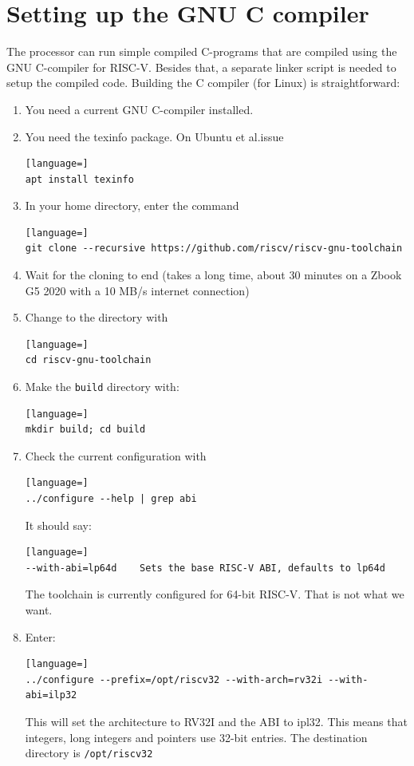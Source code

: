 \documentclass[12pt]{article}
\begin{document}
\section{Setting up the GNU C compiler}
The processor can run simple compiled C-programs that are compiled using the GNU C-compiler for RISC-V. Besides that, a separate linker script is needed to setup the compiled code. Building the C compiler (for Linux) is straightforward:

\begin{enumerate}
\item You need a current GNU C-compiler installed.
\item You need the texinfo package. On Ubuntu et al.\@ issue
\begin{lstlisting}[language=]
apt install texinfo
\end{lstlisting}
\item In your home directory, enter the command
\begin{lstlisting}[language=]
git clone --recursive https://github.com/riscv/riscv-gnu-toolchain
\end{lstlisting}
\item Wait for the cloning to end (takes a long time, about 30 minutes on a Zbook G5 2020 with a 10 MB/s internet connection)
\item Change to the directory with
\begin{lstlisting}[language=]
cd riscv-gnu-toolchain
\end{lstlisting}
\item Make the \texttt{build} directory with:
\begin{lstlisting}[language=]
mkdir build; cd build
\end{lstlisting}
\item Check the current configuration with
\begin{lstlisting}[language=]
../configure --help | grep abi
\end{lstlisting}
      It should say:
\begin{lstlisting}[language=]
--with-abi=lp64d    Sets the base RISC-V ABI, defaults to lp64d
\end{lstlisting}
The toolchain is currently configured for 64-bit RISC-V. That is not what we want.
\item Enter:
\begin{lstlisting}[language=]
../configure --prefix=/opt/riscv32 --with-arch=rv32i --with-abi=ilp32
\end{lstlisting}
This will set the architecture to RV32I and the ABI to ipl32. This means that integers, long integers and pointers use 32-bit entries. The destination directory is \lstinline|/opt/riscv32|

\end{enumerate}
\end{document}
